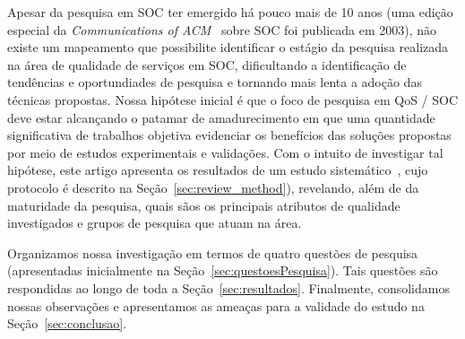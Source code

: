 Apesar da pesquisa em SOC ter emergido h\'{a} pouco mais de 10 anos 
(uma edi\c c\~{a}o especial da \emph{Communications of ACM}~\cite{papazoglou:cacm2003} sobre SOC foi publicada em 2003), n\~{a}o existe um mapeamento que possibilite identificar o est\'{a}gio da pesquisa realizada na \'{a}rea de qualidade de servi\c cos em SOC, dificultando a identifica\c c\~{a}o de tend\^{e}ncias e oportundiades de pesquisa e tornando mais lenta a ado\c c\~{a}o das t\'{e}cnicas propostas. Nossa hip\'{o}tese inicial \'{e} que o foco de pesquisa em QoS / SOC deve estar alcan\c cando o patamar de amadurecimento em que uma quantidade significativa de trabalhos objetiva evidenciar os benef\'{i}cios das solu\c c\~{o}es propostas por meio de estudos experimentais e valida\c c\~{o}es. Com o intuito de investigar tal hip\'{o}tese, este artigo apresenta os resultados de um estudo sistem\'{a}tico~\cite{Petersen_Feldt_Mujtaba_Mattsson_2007}, cujo protocolo \'{e} descrito na Se\c c\~{a}o~\ref{sec:review_method}), revelando, al\'{e}m de da maturidade da pesquisa, quais s\~{a}os os principais atributos de qualidade investigados e grupos de pesquisa que atuam na \'{a}rea. 

Organizamos nossa investiga\c{c}\~{a}o em termos de quatro quest\~{o}es de pesquisa (apresentadas inicialmente na Se\c c\~{a}o~\ref{sec:questoesPesquisa}). Tais quest\~{o}es s\~{a}o respondidas ao longo de toda a Se\c c\~{a}o~\ref{sec:resultados}. Finalmente, consolidamos nossas observa\c c\~{o}es e apresentamos as amea\c cas para a validade do estudo na Se\c c\~{a}o~\ref{sec:conclusao}. 
 
 



